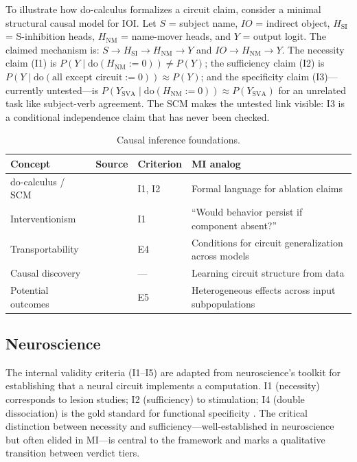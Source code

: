 \documentclass{article}
\begin{document}
To illustrate how do-calculus formalizes a circuit claim, consider a minimal structural causal model for IOI. Let $S$ = subject name, $IO$ = indirect object, $H_{\text{SI}}$ = S-inhibition heads, $H_{\text{NM}}$ = name-mover heads, and $Y$ = output logit. The claimed mechanism is: $S \to H_{\text{SI}} \to H_{\text{NM}} \to Y$ and $IO \to H_{\text{NM}} \to Y$. The necessity claim (I1) is $P(Y \mid \mathrm{do}(H_{\text{NM}} := 0)) \neq P(Y)$; the sufficiency claim (I2) is $P(Y \mid \mathrm{do}(\text{all except circuit} := 0)) \approx P(Y)$; and the specificity claim (I3)---currently untested---is $P(Y_{\text{SVA}} \mid \mathrm{do}(H_{\text{NM}} := 0)) \approx P(Y_{\text{SVA}})$ for an unrelated task like subject-verb agreement. The SCM makes the untested link visible: I3 is a conditional independence claim that has never been checked.

\begin{table}[H]
\centering\small
\caption{Causal inference foundations.}
\renewcommand{\arraystretch}{1.12}
\begin{tabular}{@{}l>{\raggedright\arraybackslash}p{2.5cm}l>{\raggedright\arraybackslash}p{4.2cm}@{}}
\toprule
\textbf{Concept} & \textbf{Source} & \textbf{Criterion} & \textbf{MI analog} \\
\midrule
do-calculus / SCM & \citet{pearl2009causality} & I1, I2 & Formal language for ablation claims \\
\midrule
Interventionism & \citet{woodward2003making} & I1 & ``Would behavior persist if component absent?'' \\
\midrule
Transportability & \citet{pearl2011transportability} & E4 & Conditions for circuit generalization across models \\
\midrule
Causal discovery & \citet{spirtes2000causation} & --- & Learning circuit structure from data \\
\midrule
Potential outcomes & \citet{rubin1974estimating} & E5 & Heterogeneous effects across input subpopulations \\
\bottomrule
\end{tabular}
\end{table}


\subsection{Neuroscience}
\label{sec:neuro}

The internal validity criteria (I1--I5) are adapted from neuroscience's toolkit for establishing that a neural circuit implements a computation. I1 (necessity) corresponds to lesion studies; I2 (sufficiency) to stimulation; I4 (double dissociation) is the gold standard for functional specificity \citep{woodward2003making}. The critical distinction between necessity and sufficiency---well-established in neuroscience but often elided in MI---is central to the framework and marks a qualitative transition between verdict tiers.
\end{document}
